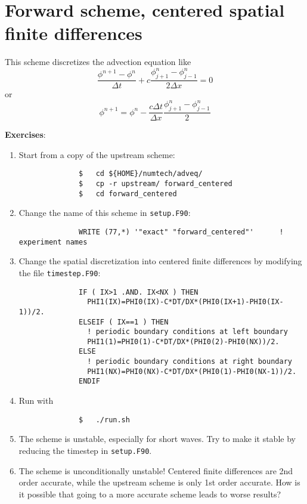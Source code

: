 \documentclass[a4paper]{article}
\begin{document}
\section{Forward scheme, centered spatial finite differences}
%
\par
This scheme discretizes the advection equation like
%
\begin{equation*}
	\frac{\phi^{n+1}-\phi^{n}}{\Delta t}+c\frac{\phi^{n}_{j+1}-\phi^{n}_{j-1}}{2\Delta x}=0
\end{equation*}
%
or
%
\begin{equation*}
	\phi^{n+1}=\phi^{n}-\frac{c\Delta t}{\Delta x}\frac{\phi^{n}_{j+1}-\phi^{n}_{j-1}}{2}
\end{equation*}
%
\par\vspace*{3ex}
\textbf{Exercises}:
%
\begin{enumerate}
	\item Start from a copy of the upstream scheme:
		\begin{verbatim}
			  $   cd ${HOME}/numtech/adveq/
			  $   cp -r upstream/ forward_centered
			  $   cd forward_centered
		\end{verbatim}
	\item Change the name of this scheme in \verb+setup.F90+:
		\begin{verbatim}
			  WRITE (77,*) '"exact" "forward_centered"'      ! experiment names
		\end{verbatim}
	\item Change the spatial discretization into centered finite differences by modifying the file \verb+timestep.F90+:
		\begin{verbatim}
			  IF ( IX>1 .AND. IX<NX ) THEN
			    PHI1(IX)=PHI0(IX)-C*DT/DX*(PHI0(IX+1)-PHI0(IX-1))/2.
			  ELSEIF ( IX==1 ) THEN
			    ! periodic boundary conditions at left boundary
			    PHI1(1)=PHI0(1)-C*DT/DX*(PHI0(2)-PHI0(NX))/2.
			  ELSE
			    ! periodic boundary conditions at right boundary
			    PHI1(NX)=PHI0(NX)-C*DT/DX*(PHI0(1)-PHI0(NX-1))/2.
			  ENDIF		
		\end{verbatim}
	\item Run with
		\begin{verbatim}
			  $   ./run.sh
		\end{verbatim}
	\item The scheme is unstable, especially for short waves. Try to make it stable by reducing the timestep in \verb+setup.F90+.
	\item The scheme is unconditionally unstable! Centered finite differences are 2nd order accurate, while the upstream scheme is only 1st order accurate. How is it possible that going to a more accurate scheme leads to worse results?
\end{enumerate}
%
\end{document}
